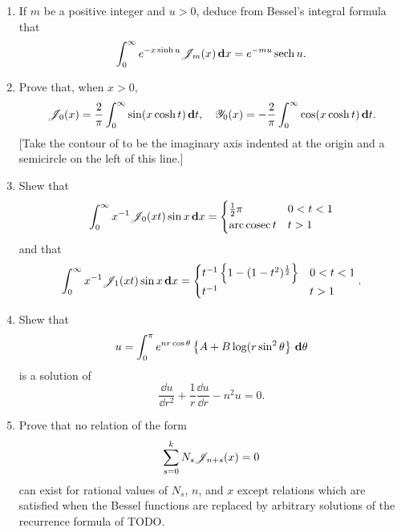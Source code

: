 \begin{enumerate}
\item
  If $m$ be a positive integer and $u>0$, deduce from Bessel's
  integral formula that
  $$
  \int_{0}^{\infty}
  e^{-x \sinh u} \mathscr{J}_{m}(x) \, \mathbf{d} x
  =
  e^{-m u} \operatorname{sech} u.
  $$
\item
  Prove that, when $x>0$,
  $$
  \mathscr{J}_{0}(x) = \frac{2}{\pi} \int_{0}^{\infty} \sin(x \cosh t)
  \, \mathbf{d} t,
  \quad
  \mathscr{Y}_{0}(x) = -\frac{2}{\pi}
  \int_{0}^{\infty} \cos(x \cosh t)
  \, \mathbf{d} t.
  $$
  [Take the contour of  to be the imaginary axis
  indented at the origin and a semicircle on the left of this line.]
\item
  Shew that
  $$
  \int_{0}^{\infty} x^{-1} \mathscr{J}_{0}(xt) \sin x \, \mathbf{d} x
  =
  \begin{cases}
    \frac{1}{2}\pi & 0 < t < 1
    \\
    \operatorname{arc\,cosec} t & t > 1
  \end{cases}
  $$
  and that
  $$
  \int_{0}^{\infty} x^{-1} \mathscr{J}_{1}(xt) \sin x \, \mathbf{d} x
  =
  \begin{cases}
    t^{-1} \left\{  1 - (1-t^{2})^{\frac{1}{2}}   \right\} & 0 < t < 1
    \\
    t^{-1} & t > 1
  \end{cases}.
  $$
\item
  Shew that
  $$
  u = \int_{0}^{\pi} e^{nr\cos\theta} \left\{ A + B \log(r\sin^{2}\theta \right\} \, \mathbf{d} \theta
  $$
  is a solution of
  $$
  \frac{\dd u}{\dd r^{2}} + \frac{1}{r} \frac{\dd u}{\dd r} - n^{2} u
  = 0.
  $$
\item
  Prove that no relation of the form
  $$
  \sum_{s=0}^{k} N_{s} \mathscr{J}_{n+s}(x) = 0
  $$
  can exist for rational values of $N_{s}$, $n$, and $x$ except
  relations which are satisfied when the Bessel functions are replaced
  by arbitrary solutions of the recurrence formula of TODO.


\end{enumerate}
